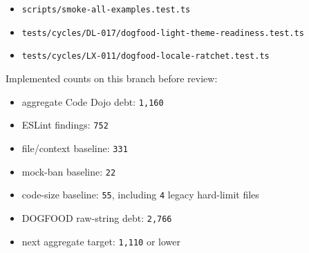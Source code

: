 \begin{itemize}
\item
  \texttt{s\allowbreak{}c\allowbreak{}r\allowbreak{}i\allowbreak{}p\allowbreak{}t\allowbreak{}s\allowbreak{}/\allowbreak{}s\allowbreak{}m\allowbreak{}o\allowbreak{}k\allowbreak{}e\allowbreak{}-\allowbreak{}a\allowbreak{}l\allowbreak{}l\allowbreak{}-\allowbreak{}e\allowbreak{}x\allowbreak{}a\allowbreak{}m\allowbreak{}p\allowbreak{}l\allowbreak{}e\allowbreak{}s\allowbreak{}.\allowbreak{}t\allowbreak{}e\allowbreak{}s\allowbreak{}t\allowbreak{}.\allowbreak{}t\allowbreak{}s}
\item
  \texttt{t\allowbreak{}e\allowbreak{}s\allowbreak{}t\allowbreak{}s\allowbreak{}/\allowbreak{}c\allowbreak{}y\allowbreak{}c\allowbreak{}l\allowbreak{}e\allowbreak{}s\allowbreak{}/\allowbreak{}D\allowbreak{}L\allowbreak{}-\allowbreak{}0\allowbreak{}1\allowbreak{}7\allowbreak{}/\allowbreak{}d\allowbreak{}o\allowbreak{}g\allowbreak{}f\allowbreak{}o\allowbreak{}o\allowbreak{}d\allowbreak{}-\allowbreak{}l\allowbreak{}i\allowbreak{}g\allowbreak{}h\allowbreak{}t\allowbreak{}-\allowbreak{}t\allowbreak{}h\allowbreak{}e\allowbreak{}m\allowbreak{}e\allowbreak{}-\allowbreak{}r\allowbreak{}e\allowbreak{}a\allowbreak{}d\allowbreak{}i\allowbreak{}n\allowbreak{}e\allowbreak{}s\allowbreak{}s\allowbreak{}.\allowbreak{}t\allowbreak{}e\allowbreak{}s\allowbreak{}t\allowbreak{}.\allowbreak{}t\allowbreak{}s}
\item
  \texttt{t\allowbreak{}e\allowbreak{}s\allowbreak{}t\allowbreak{}s\allowbreak{}/\allowbreak{}c\allowbreak{}y\allowbreak{}c\allowbreak{}l\allowbreak{}e\allowbreak{}s\allowbreak{}/\allowbreak{}L\allowbreak{}X\allowbreak{}-\allowbreak{}0\allowbreak{}1\allowbreak{}1\allowbreak{}/\allowbreak{}d\allowbreak{}o\allowbreak{}g\allowbreak{}f\allowbreak{}o\allowbreak{}o\allowbreak{}d\allowbreak{}-\allowbreak{}l\allowbreak{}o\allowbreak{}c\allowbreak{}a\allowbreak{}l\allowbreak{}e\allowbreak{}-\allowbreak{}r\allowbreak{}a\allowbreak{}t\allowbreak{}c\allowbreak{}h\allowbreak{}e\allowbreak{}t\allowbreak{}.\allowbreak{}t\allowbreak{}e\allowbreak{}s\allowbreak{}t\allowbreak{}.\allowbreak{}t\allowbreak{}s}
\end{itemize}

Implemented counts on this branch before review:

\begin{itemize}
\tightlist
\item
  aggregate Code Dojo debt: \texttt{1\allowbreak{},\allowbreak{}1\allowbreak{}6\allowbreak{}0}
\item
  ESLint findings: \texttt{7\allowbreak{}5\allowbreak{}2}
\item
  file/context baseline: \texttt{3\allowbreak{}3\allowbreak{}1}
\item
  mock-ban baseline: \texttt{2\allowbreak{}2}
\item
  code-size baseline: \texttt{5\allowbreak{}5}, including \texttt{4} legacy hard-limit files
\item
  DOGFOOD raw-string debt: \texttt{2\allowbreak{},\allowbreak{}7\allowbreak{}6\allowbreak{}6}
\item
  next aggregate target: \texttt{1\allowbreak{},\allowbreak{}1\allowbreak{}1\allowbreak{}0} or lower
\end{itemize}

